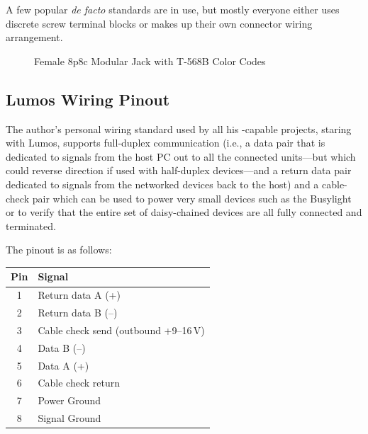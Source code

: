 A few popular \emph{de facto} standards are in use, but mostly everyone either uses
discrete screw terminal blocks or makes up their own connector wiring arrangement.
\begin{figure}
\begin{center}
	\caption{Female 8p8c Modular Jack with T-568B Color Codes\label{fig:8p8c}}
\end{center}
\end{figure}

\subsection{Lumos Wiring Pinout}
The author's personal wiring standard used by all his -capable projects, staring with Lumos, supports full-duplex communication (i.e., a data pair that is dedicated
to signals from the host PC out to all the connected units---but which could reverse direction if used with half-duplex devices---and a return data pair dedicated to signals from
the networked devices back to the host) and a cable-check pair which can be used to power very small devices such as the Busylight or to verify that the entire set of daisy-chained
devices are all fully connected and terminated.

The pinout is as follows:
\begin{center}
\begin{tabular}{cl}\toprule
	\bfseries Pin & \bfseries Signal\\\midrule
	1&Return data A (+)\\
	2&Return data B (--)\\
	3&Cable check send (outbound +9--16\,V)\\
	4&Data B (--)\\
	5&Data A (+)\\
	6&Cable check return\\
	7&Power Ground\\
	8&Signal Ground\\\bottomrule
\end{tabular}
\end{center}

